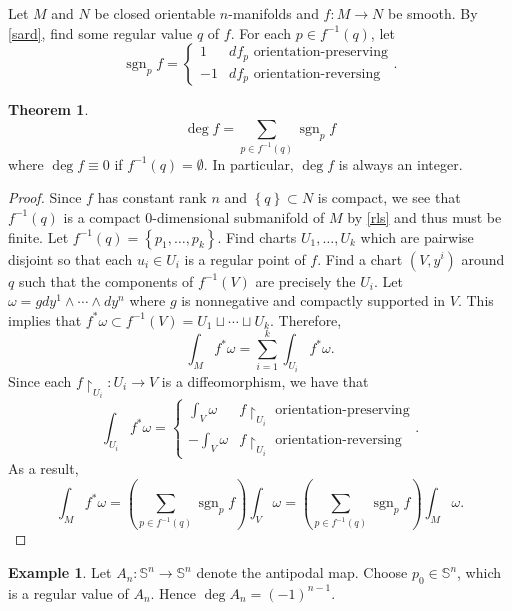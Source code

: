 \documentclass[10pt,letterpaper,cm]{nupset}
\theoremstyle{definition}
\newtheorem{exmp}[definition]{Example}
\theoremstyle{theorem}
\newtheorem{theorem}[definition]{Theorem}
\theoremstyle{remark}
\renewcommand{\S}{\mathbb S}
\newcommand{\1}{\mathbf{1}}
\newcommand{\0}{\vec 0}
\DeclareMathOperator{\sgn}{sgn}
\begin{document}
Let $M$ and $N$ be closed orientable $n$-manifolds and $f: M \to N$ be smooth. By \cref{sard}, find some regular value $q$ of $f$. For each $p\in f^{-1}(q)$, let 
$$ \sgn_pf = \begin{cases}
1 & df_p \text{ orientation-preserving} 
\\ {-1}  & df_p \text{ orientation-reversing} \end{cases}.$$ 

\begin{theorem}
$$\deg f = \sum_{p\in f^{-1}(q)} \sgn_pf$$ where $\deg f \equiv 0$ if $f^{-1}(q) = \emptyset$.
In particular, $\deg f$ is always an integer. 
\end{theorem}
\begin{proof}
Since $f$ has constant rank $n$ and $\left\{q\right\}\subset N$ is compact, we see that $f^{-1}(q)$ is a compact $0$-dimensional submanifold  of $M$ by \cref{rls}  and thus must be finite. Let $f^{-1}(q) = \left\{p_1, \ldots, p_k\right\}$. Find  charts $U_1, \ldots, U_k$ which are pairwise disjoint so that each $u_i \in U_i$ is a regular point of $f$. Find a chart $\left(V, y^i\right)$ around $q$ such that the components of $f^{-1}(V)$ are precisely the $U_i$. Let $\omega = gdy^1 \wedge \cdots \wedge dy^n$ where $g$ is nonnegative and compactly supported in $V$. This implies that $f^{\ast}\omega \subset f^{-1}(V) =U_1 \sqcup \cdots \sqcup U_k$. Therefore, $$  \int_Mf^{\ast}\omega =\sum_{i=1}^k\int_{U_i}f^{\ast}\omega .$$ Since each $f\restriction_{U_i} : U_i \to V$ is a diffeomorphism, we have that $$ \int_{U_i}f^{\ast}\omega =
\begin{cases}
\int_{V} \omega & f\restriction_{U_i}  \text{ orientation-preserving} 
\\ {-\int_V\omega}  & f\restriction_{U_i} \text{ orientation-reversing}
\end{cases} .$$ As a result, $$\int_M f^{\ast} \omega  =\left(\sum_{p\in f^{-1}(q)} \sgn_pf \right)\int_V \omega =\left(\sum_{p\in f^{-1}(q)} \sgn_pf \right)\int_M \omega .$$
\end{proof}

\begin{exmp}
Let $A_n: \S^n \to \S^n$ denote the antipodal map. Choose $p_0 \in \S^n$, which is a regular value of $A_n$. Hence $\deg A_n = ({-1})^{n-1}$.
\end{exmp}
\end{document}
